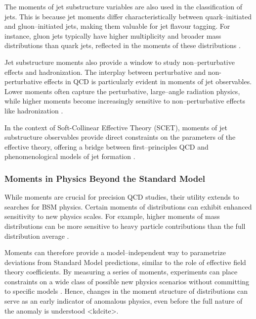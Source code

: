         The moments of jet substructure variables are also used in the classification of jets.
        This is because jet moments differ characteristically between quark--initiated and gluon--initiated jets, making them valuable for jet flavour tagging.
        For instance, gluon jets typically have higher multiplicity and broader mass distributions than quark jets, reflected in the moments of these distributions .
    
        Jet substructure moments also provide a window to study non--perturbative effects and hadronization.
        The interplay between perturbative and non-perturbative effects in QCD is particularly evident in moments of jet observables.
        Lower moments often capture the perturbative, large--angle radiation physics, while higher moments become increasingly sensitive to non--perturbative effects like hadronization .
    
        In the context of Soft-Collinear Effective Theory (SCET), moments of jet substructure observables provide direct constraints on the parameters of the effective theory, offering a bridge between first--principles QCD and phenomenological models of jet formation .

        \subsubsection{Moments in Physics Beyond the Standard Model}
            While moments are crucial for precision QCD studies, their utility extends to searches for BSM physics.
            Certain moments of distributions can exhibit enhanced sensitivity to new physics scales.
            For example, higher moments of mass distributions can be more sensitive to heavy particle contributions than the full distribution average .
    
            Moments can therefore provide a model--independent way to parametrize deviations from Standard Model predictions, similar to the role of effective field theory coefficients.
            By measuring a series of moments, experiments can place constraints on a wide class of possible new physics scenarios without committing to specific models .
            Hence, changes in the moment structure of distributions can serve as an early indicator of anomalous physics, even before the full nature of the anomaly is understood <kd{cite}>.

